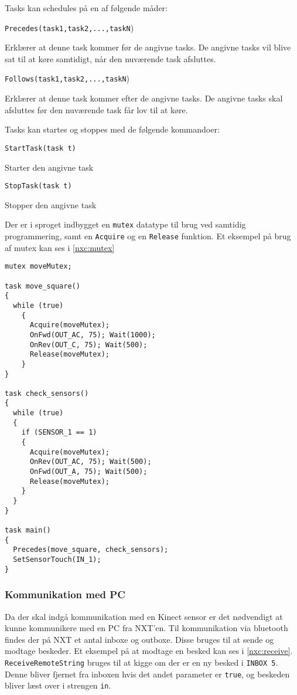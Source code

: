 Tasks kan schedules på en af følgende måder:

\begin{description}
\item{\lstinline[style=c]!Precedes(task1,task2,...,taskN!)}

Erklærer at denne task kommer før de angivne tasks. 
De angivne tasks vil blive sat til at køre samtidigt, når den nuværende task afsluttes.
\item{\lstinline[style=c]!Follows(task1,task2,...,taskN!)}

Erklærer at denne task kommer efter de angivne tasks. 
De angivne tasks skal afsluttes før den nuværende task får lov til at køre.
\end{description}

Tasks kan startes og stoppes med de følgende kommandoer:

\begin{description}
\item{\lstinline[style=c]!StartTask(task t)!}

Starter den angivne task

\item{\lstinline[style=c]!StopTask(task t)!}

Stopper den angivne task
\end{description}

Der er i sproget indbygget en \lstinline[style=c]!mutex! datatype til brug ved samtidig programmering, samt en \lstinline[style=c]!Acquire! og en \lstinline[style=c]!Release! funktion.
Et eksempel på brug af mutex kan ses i \cref{nxc:mutex}

\begin{lstlisting}[style=c,label=nxc:mutex, caption={Eksempel på brug af mutex}]
mutex moveMutex;

task move_square()
{
  while (true)
    {
      Acquire(moveMutex);
      OnFwd(OUT_AC, 75); Wait(1000);
      OnRev(OUT_C, 75); Wait(500);
      Release(moveMutex);
    }
}

task check_sensors()
{
  while (true)
  {
    if (SENSOR_1 == 1)
    {
      Acquire(moveMutex);
      OnRev(OUT_AC, 75); Wait(500);
      OnFwd(OUT_A, 75); Wait(500);
      Release(moveMutex);
    }
  }
}

task main()
{
  Precedes(move_square, check_sensors);
  SetSensorTouch(IN_1);
}
\end{lstlisting}

\subsubsection{Kommunikation med PC}
Da der skal indgå kommunikation med en Kinect sensor er det nødvendigt at kunne kommunikere med en PC fra NXT'en.
Til kommunikation via bluetooth findes der på NXT et antal inboxe og outboxe. 
Disse bruges til at sende og modtage beskeder.
Et eksempel på at modtage en besked kan ses i \cref{nxc:receive}.
\lstinline[style=c]|ReceiveRemoteString| bruges til at kigge om der er en ny besked i \lstinline[style=c]!INBOX 5!.
Denne bliver fjernet fra inboxen hvis det andet parameter er \lstinline[style=c]|true|, og beskeden bliver læst over i strengen \lstinline[style=c]|in|.

